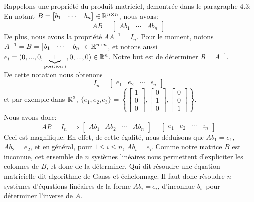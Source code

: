 \noindent Rappelons une propriété du produit matriciel, démontrée dans le paragraphe 4.3: \\
En notant $B = \begin{bmatrix} b_1 & \cdots & b_n \end{bmatrix} \in \mathbb{R}^{n \times n}$, nous avons:
$$AB = \begin{bmatrix} Ab_1 & \cdots & Ab_n \end{bmatrix}$$
De plus, nous avons la propriété $AA^{-1} = I_n$. Pour le moment, notons $A^{-1} = B = \begin{bmatrix} b_1 & \cdots & b_n \end{bmatrix} \in \mathbb{R}^{n \times n}$, et notons aussi $e_i = (0, ..., 0, \underbrace{1}_{\text{position i}}, 0, ..., 0) \in \mathbb{R}^n$. Notre but est de déterminer $B = A^{-1}$. \\
De cette notation nous obtenons
$$I_n = \begin{bmatrix} e_1 & e_2 & \cdots & e_n \end{bmatrix}$$ 
et par exemple dans $\mathbb{R}^3$, $\{ e_1, e_2, e_3 \} = \left\{ \begin{bmatrix} 1 \\ 0 \\ 0 \end{bmatrix}, \begin{bmatrix} 0 \\ 1 \\ 0 \end{bmatrix}, \begin{bmatrix} 0 \\ 0 \\ 1 \end{bmatrix} \right\}$. \\

\noindent Nous avons donc:
$$AB = I_n \implies \begin{bmatrix} Ab_1 & Ab_2 & \cdots & Ab_n \end{bmatrix} = \begin{bmatrix} e_1 & e_2 & \cdots & e_n \end{bmatrix}$$
Ceci est magnifique. En effet, de cette égalité, nous déduisons que $Ab_1 = e_1$, $Ab_2 = e_2$, et en général, pour $1 \leq i \leq n$, $Ab_i = e_i$. Comme notre matrice $B$ est inconnue, cet ensemble de $n$ systèmes linéaires nous permettent d'expliciter les colonnes de $B$, et donc de la déterminer. Qui dit résoudre une équation matricielle dit algorithme de Gauss et échelonnage. Il faut donc résoudre $n$ systèmes d'équations linéaires de la forme $Ab_i = e_i$, d'inconnue $b_i$, pour déterminer l'inverse de $A$.\\

